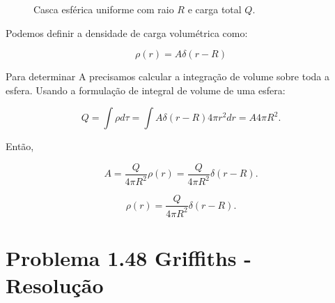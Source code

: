 \documentclass[a4paper,12pt]{article}
\begin{document}
\begin{enumerate}
    \begin{figure}[!h]
    \begin{center}
    \end{center}
    \caption{Casca esférica uniforme com raio $R$ e carga total $Q$.}
    \end{figure}

    Podemos definir a densidade de carga volumétrica como:

    \begin{equation}
        \rho(r)=A \delta(r-R)
    \end{equation}

    Para determinar A precisamos calcular a integra\c{c}\~ao de volume sobre toda a esfera. 
    Usando a formulação de integral de volume de uma esfera:

    \begin{equation}
        Q=\int \rho d \tau=\int A \delta(r-R) 4 \pi r^{2} d r=A 4 \pi R^{2}.
    \end{equation}

    Ent\~ao,

    \begin{equation}
        A=\frac{Q}{4 \pi R^{2}} \rho(r)=\frac{Q}{4 \pi R^{2}} \delta(r-R) .
    \end{equation}

    \begin{equation}
        \boxed{
        \rho(r)=\frac{Q}{4 \pi R^{2}} \delta(r-R) .
        }
    \end{equation}

\end{enumerate}

\section*{Problema 1.48 Griffiths - Resolu\c{c}\~ao}
\end{document}
